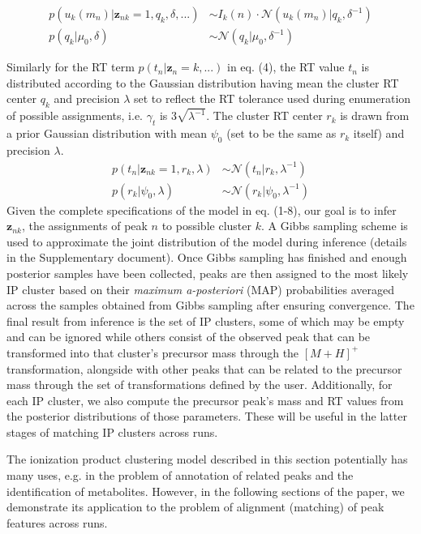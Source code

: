 \begin{align}
p(u_k(m_n)\vert\boldsymbol{z}_{nk}=1,q_k,\delta,...) &\sim I_k(n) \cdot \mathcal{N}(u_k(m_n) \vert q_k,\delta^{-1}) \\
p(q_k\vert \mu_0,\delta) &\sim \mathcal{N}(q_k \vert \mu_0,\delta^{-1})
\end{align}

Similarly for the RT term $p(t_n\vert\boldsymbol{z}_n=k,...)$ in eq. (4), the RT value $t_n$ is distributed according to the Gaussian distribution having mean the cluster RT center $q_k$ and precision $\lambda$ set to reflect the RT tolerance used during enumeration of possible assignments, i.e. $\gamma_t$ is $3\sqrt{\lambda^{-1}}$. The cluster RT center $r_k$ is drawn from a prior Gaussian distribution with mean $\psi_0$ (set to be the same as $r_k$ itself) and precision $\lambda$.
\begin{align}
p(t_n\vert\boldsymbol{z}_{nk}=1,r_k,\lambda) &\sim \mathcal{N}(t_n \vert r_k,\lambda^{-1}) \\
p(r_k\vert \psi_0,\lambda) &\sim \mathcal{N}(r_k \vert \psi_0,\lambda^{-1})
\end{align}
Given the complete specifications of the model in eq. (1-8), our goal is to infer $\boldsymbol{z}_{nk}$, the assignments of peak $n$ to possible cluster $k$. A Gibbs sampling scheme \cite{Rogers2011} is used to approximate the joint distribution of the model during inference (details in the Supplementary document). Once Gibbs sampling has finished and enough posterior samples have been collected, peaks are then assigned to the most likely IP cluster based on their \textit{maximum a-posteriori} (MAP) probabilities averaged across the samples obtained from Gibbs sampling after ensuring convergence. The final result from inference is the set of IP clusters, some of which may be empty and can be ignored while others consist of the observed peak that can be transformed into that cluster's precursor mass through the $[M+H]^+$ transformation, alongside with other peaks that can be related to the precursor mass through the set of transformations defined by the user. Additionally, for each IP cluster, we also compute the precursor peak's mass and RT values from the posterior distributions of those parameters. These will be useful in the latter stages of matching IP clusters across runs.

The ionization product clustering model described in this section potentially has many uses, e.g. in the problem of annotation of related peaks and the identification of metabolites. However, in the following sections of the paper, we demonstrate its application to the problem of alignment (matching) of peak features across runs. 


